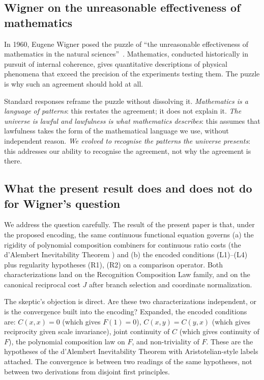 \documentclass[11pt,a4paper]{article}
\theoremstyle{definition}
\theoremstyle{remark}
\begin{document}
\subsection{Wigner on the unreasonable effectiveness of mathematics}

In 1960, Eugene Wigner posed the puzzle of ``the unreasonable
effectiveness of mathematics in the natural sciences''~\cite{Wigner1960}.
Mathematics, conducted historically in pursuit of internal coherence,
gives quantitative descriptions of physical phenomena that exceed the
precision of the experiments testing them. The puzzle is why such an
agreement should hold at all.

Standard responses reframe the puzzle without dissolving it.
\emph{Mathematics is a language of patterns}: this restates the
agreement; it does not explain it. \emph{The universe is lawful and
lawfulness is what mathematics describes}: this assumes that lawfulness
takes the form of the mathematical language we use, without independent
reason. \emph{We evolved to recognise the patterns the universe
presents}: this addresses our ability to recognise the agreement, not
why the agreement is there.

\subsection{What the present result does and does not do for Wigner's
question}\label{subsec:wigner-honest}

We address the question carefully. The result of the present paper is
that, under the proposed encoding, the same continuous functional
equation governs (a) the rigidity of polynomial composition combiners
for continuous ratio costs (the d'Alembert Inevitability Theorem
\cite{WashburnZlatanovicAllahyarov2026}) and (b) the encoded conditions
(L1)--(L4) plus regularity hypotheses (R1), (R2) on a comparison
operator. Both characterizations land on the Recognition Composition
Law family, and on the canonical reciprocal cost $J$ after branch
selection and coordinate normalization.

The skeptic's objection is direct. Are these two characterizations
independent, or is the convergence built into the encoding? Expanded,
the encoded conditions are: $C(x, x) = 0$ (which gives $F(1) = 0$),
$C(x, y) = C(y, x)$ (which gives reciprocity given scale invariance),
joint continuity of $C$ (which gives continuity of $F$), the polynomial
composition law on $F$, and non-triviality of $F$. These are the
hypotheses of the d'Alembert Inevitability Theorem with
Aristotelian-style labels attached. The convergence is between two
readings of the same hypotheses, not between two derivations from
disjoint first principles.
\end{document}
